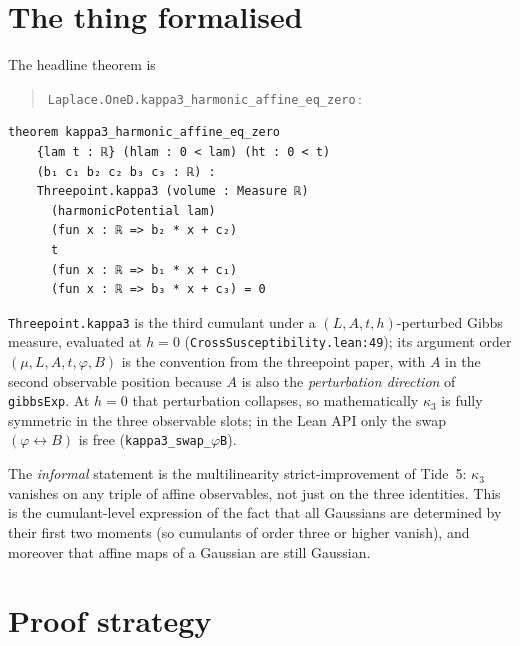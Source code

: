 \documentclass[11pt]{article}
\begin{document}
\section{The thing formalised}

The headline theorem is
\begin{quote}
\texttt{Laplace.OneD.kappa3\_harmonic\_affine\_eq\_zero}\,:
\end{quote}
\begin{verbatim}
theorem kappa3_harmonic_affine_eq_zero
    {lam t : ℝ} (hlam : 0 < lam) (ht : 0 < t)
    (b₁ c₁ b₂ c₂ b₃ c₃ : ℝ) :
    Threepoint.kappa3 (volume : Measure ℝ)
      (harmonicPotential lam)
      (fun x : ℝ => b₂ * x + c₂)
      t
      (fun x : ℝ => b₁ * x + c₁)
      (fun x : ℝ => b₃ * x + c₃) = 0
\end{verbatim}

\noindent
\texttt{Threepoint.kappa3} is the third cumulant under a
$(L, A, t, h)$-perturbed Gibbs measure, evaluated at $h = 0$
(\texttt{CrossSusceptibility.lean:49}); its argument order
$(\mu, L, A, t, \varphi, B)$ is the convention from the threepoint
paper, with $A$ in the second observable position because $A$ is also
the \emph{perturbation direction} of \texttt{gibbsExp}. At $h = 0$
that perturbation collapses, so mathematically
$\kappa_3$ is fully symmetric in the three observable slots; in the
Lean API only the swap $(\varphi \leftrightarrow B)$ is free
(\texttt{kappa3\_swap\_$\varphi$B}).

The \emph{informal} statement is the multilinearity strict-improvement
of Tide~5: $\kappa_3$ vanishes on any triple of affine observables,
not just on the three identities. This is the cumulant-level
expression of the fact that all Gaussians are determined by their
first two moments (so cumulants of order three or higher vanish), and
moreover that affine maps of a Gaussian are still Gaussian.

\section{Proof strategy}
\end{document}
